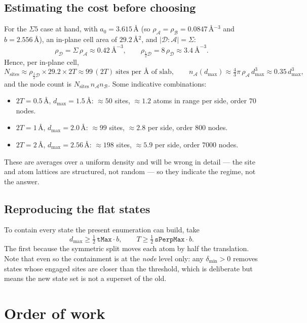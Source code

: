 \documentclass[11pt]{article}
\newcommand{\A}{\mathcal{A}}
\newcommand{\B}{\mathcal{B}}
\newcommand{\D}{\mathcal{D}}
\newcommand{\dmax}{d_{\max}}
\newcommand{\dmin}{\delta_{\min}}
\begin{document}
\subsection*{Estimating the cost before choosing}

For the $\Sigma 5$ case at hand, with $a_0 = 3.615$\,\AA{} (so
$\rho_\A = \rho_\B = 0.0847$\,\AA$^{-3}$ and $b = 2.556$\,\AA), an in-plane cell
area of $29.2$\,\AA$^2$, and $\lvert \D : \A \rvert = \Sigma$:
\[
  \rho_{\D} = \Sigma\,\rho_\A \approx 0.42\ \text{\AA}^{-3},
  \qquad
  \rho_{\frac{1}{2}\D} = 8\,\rho_{\D} \approx 3.4\ \text{\AA}^{-3} .
\]
Hence, per in-plane cell,
\[
  N_{\text{sites}} \approx \rho_{\frac{1}{2}\D}\times 29.2 \times 2T
  \approx 99\,(2T)\ \text{sites per \AA{} of slab},
  \qquad
  n_\A(\dmax) \approx \tfrac{4}{3}\pi\,\rho_\A\,\dmax^{3}
  \approx 0.35\,\dmax^{3},
\]
and the node count is $N_{\text{sites}}\,n_\A n_\B$. Some indicative
combinations:
\begin{itemize}
  \item $2T = 0.5$\,\AA, $\dmax = 1.5$\,\AA: $\approx 50$ sites, $\approx 1.2$
        atoms in range per side, order $70$ nodes.
  \item $2T = 1$\,\AA, $\dmax = 2.0$\,\AA: $\approx 99$ sites, $\approx 2.8$ per
        side, order $800$ nodes.
  \item $2T = 2$\,\AA, $\dmax = 2.56$\,\AA: $\approx 198$ sites, $\approx 5.9$
        per side, order $7000$ nodes.
\end{itemize}
These are averages over a uniform density and will be wrong in detail --- the
site and atom lattices are structured, not random --- so they indicate the
regime, not the answer.

\subsection*{Reproducing the flat states}

To contain every state the present enumeration can build, take
\[
  \dmax \ge \tfrac{1}{2}\,\texttt{tMax}\cdot b,
  \qquad
  T \ge \tfrac{1}{2}\,\texttt{sPerpMax}\cdot b .
\]
The first because the symmetric split moves each atom by half the translation.
Note that even so the containment is at the \emph{node} level only: any
$\dmin > 0$ removes states whose engaged sites are closer than the threshold,
which is deliberate but means the new state set is not a superset of the old.

\section*{Order of work}
\end{document}
